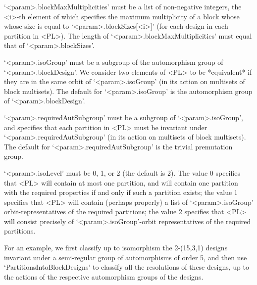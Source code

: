 `<param>.blockMaxMultiplicities' must be a list of non-negative integers,
the <i>-th element of which specifies the maximum multiplicity of a block
whose whose size is equal to `<param>.blockSizes[<i>]' (for each design
in each partition in <PL>). The length of `<param>.blockMaxMultiplicities'
must equal that of `<param>.blockSizes'.

`<param>.isoGroup' must be a subgroup of the automorphism group of
`<param>.blockDesign'. We consider two elements of <PL> to be
*equivalent* if they are in the same orbit of `<param>.isoGroup'
(in its action on multisets of block multisets).  The default for
`<param>.isoGroup' is the automorphism group of `<param>.blockDesign'.

`<param>.requiredAutSubgroup' must be a subgroup of `<param>.isoGroup',
and specifies that each partition in <PL> must be invariant under
`<param>.requiredAutSubgroup' (in its action on multisets of block
multisets). The default for `<param>.requiredAutSubgroup' is the trivial
premutation group.

`<param>.isoLevel' must be 0, 1, or 2 (the default is 2).  The value 0
specifies that <PL> will contain at most one partition, and will contain
one partition with the required properties if and only if such a partition
exists; the value 1 specifies that <PL> will contain (perhaps properly)
a list of `<param>.isoGroup' orbit-representatives of the required
partitions; the value 2 specifies that <PL> will consist precisely of
`<param>.isoGroup'-orbit representatives of the required partitions.

For an example, we first classify up to isomorphism the 2-(15,3,1)
designs invariant under a semi-regular group of automorphisms of order 5,
and then use `PartitionsIntoBlockDesigns' to classify all the resolutions
of these designs, up to the actions of the respective automorphism groups
of the designs.


